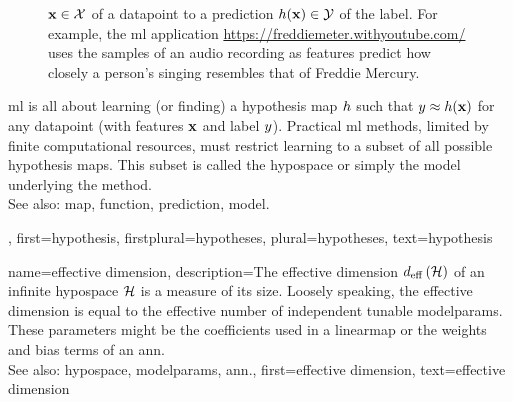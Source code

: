 {{\begin{figure}[htbp]
{				${\bf x} \in \mathcal{X}$ of a \gls{datapoint} to a \gls{prediction} $h({\bf x}) \in \mathcal{Y}$ of the \gls{label}. 
				For example, the \gls{ml} application \url{https://freddiemeter.withyoutube.com/} uses the samples of an audio 
				recording as \glspl{feature} predict how closely a person’s singing resembles that of Freddie Mercury.
				}
		\end{figure}
		\Gls{ml} is all about learning (or finding) a hypothesis \gls{map} $h$ 
		such that $y \approx h({\bf x})$ for any \gls{datapoint} 
		(with \glspl{feature} ${\bf x}$ and \gls{label} $y$). Practical \gls{ml} methods, 
		limited by finite computational resources, must restrict learning to a subset of all possible 
		hypothesis maps. This subset is called the \gls{hypospace} or simply the \gls{model} underlying 
		the method.
					\\ 
		See also: \gls{map}, \gls{function}, \gls{prediction}, \gls{model}.},
	first={hypothesis},
	firstplural={hypotheses},
	plural={hypotheses},
	text={hypothesis}  
}

{name={effective dimension},
	description={The effective dimension $d_{\rm eff} \left( \mathcal{H} \right)$ of 
		an infinite \gls{hypospace} $\mathcal{H}$ is a measure of its size. Loosely speaking, the 
		effective dimension is equal to the effective number of independent tunable \glspl{modelparam}. 
		These \glspl{parameter} might be the coefficients used in a \gls{linearmap} or the 
		\gls{weights} and \gls{bias} terms of an \gls{ann}.
					\\ 
		See also: \gls{hypospace}, \glspl{modelparam}, \gls{ann}.},
	first={effective dimension},
	text={effective dimension}  
}

